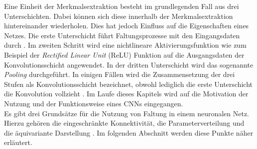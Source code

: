 		
		
	 	
	
		Eine Einheit der Merkmalsextraktion besteht im grundlegenden Fall aus drei Unterschichten. Dabei können sich diese innerhalb der Merkmalsextraktion hintereinander wiederholen. Dies hat jedoch Einfluss auf die Eigenschaften eines Netzes. Die erste Unterschicht führt Faltungsprozesse mit den Eingangsdaten durch \cite{deeplearning}. Im zweiten Schritt wird eine nichtlineare Aktivierungsfunktion wie zum Beispiel der \textit{Rectified Linear Unit} (ReLU) Funktion auf die Ausgangsdaten der Konvolutionsschicht angewendet. In der dritten Unterschicht wird das sogenannte \textit{Pooling} durchgeführt. In einigen Fällen wird die Zusammensetzung der drei Stufen als Konvolutionsschicht bezeichnet, obwohl lediglich die erste Unterschicht die Konvolution vollzieht \cite{deeplearning}. Im Laufe dieses Kapitels wird auf die Motivation der Nutzung und der Funktionsweise eines CNNs eingegangen.\\
		
		Es gibt drei Grundsätze für die Nutzung von Faltung in einem neuronalen Netz. Hierzu gehören die eingeschränkte Konnektivität, die Parameterverteilung und die äquivariante Darstellung \cite{deeplearning}. Im folgenden Abschnitt werden diese Punkte näher erläutert.\\
		
